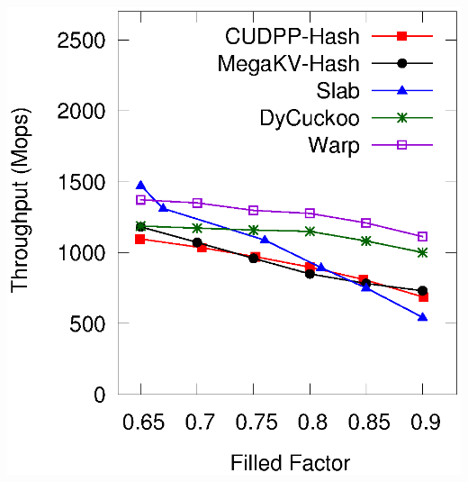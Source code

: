 \begin{minipage}{\textwidth}
\begin{minipage}[b]{0.49\textwidth}
\begin{minipage}{0.49\textwidth}
			\centerline{}
		\end{minipage}
	\end{minipage}
	\hfill
	\begin{minipage}[b]{0.49\textwidth}
		\begin{minipage}{0.49\linewidth}\centering
			\includegraphics[width=\textwidth]{../pic/static-load_factor/reddit/insert.eps}
			\centerline{}
		\end{minipage}
		\hfill
		\begin{minipage}{0.49\linewidth}\centering

\end{minipage}
\end{minipage}
\end{minipage}
